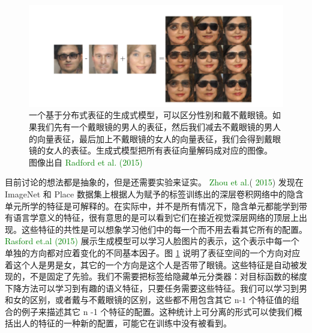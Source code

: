 \begin{figure}[h]
\centering
\includegraphics[width=13cm]{fig/chap15/15_9.png}
\caption{一个基于分布式表征的生成式模型，可以区分性别和戴不戴眼镜。如果我们先有一个戴眼镜的男人的表征，然后我们减去不戴眼镜的男人的向量表征，最后加上不戴眼镜的女人的向量表征，我们会得到戴眼镜的女人的表征。生成式模型把所有表征向量解码成对应的图像。 图像出自 \textcolor{green}{Radford et al. (2015)}}
\label{fig:15_9}
\end{figure}


目前讨论的想法都是抽象的，但是还需要实验来证实。 \textcolor{green}{Zhou et al.}( \textcolor{green}{2015}) 发现在 ImageNet 和  Place 数据集上根据人为赋予的标签训练出的深层卷积网络中的隐含单元所学的特征是可解释的。在实际中，并不是所有情况下，隐含单元都能学到带有语言学意义的特征，很有意思的是可以看到它们在接近视觉深层网络的顶层上出现。这些特征的共性是可以想象学习他们中的每一个而不用去看其它所有的配置。 \textcolor{green}{Rasford et.al (2015)} 展示生成模型可以学习人脸图片的表示，这个表示中每一个单独的方向都对应着变化的不同基本因子。图 \ref{fig:15_9} 说明了表征空间的一个方向对应着这个人是男是女，其它的一个方向是这个人是否带了眼镜。这些特征是自动被发现的，不是固定了先验。我们不需要把标签给隐藏单元分类器：对目标函数的梯度下降方法可以学习到有趣的语义特征，只要任务需要这些特征。我们可以学习到男和女的区别，或者戴与不戴眼镜的区别，这些都不用包含其它 n-1 个特征值的组合的例子来描述其它 n -1 个特征的配置。这种统计上可分离的形式可以使我们概括出人的特征的一种新的配置，可能它在训练中没有被看到。























